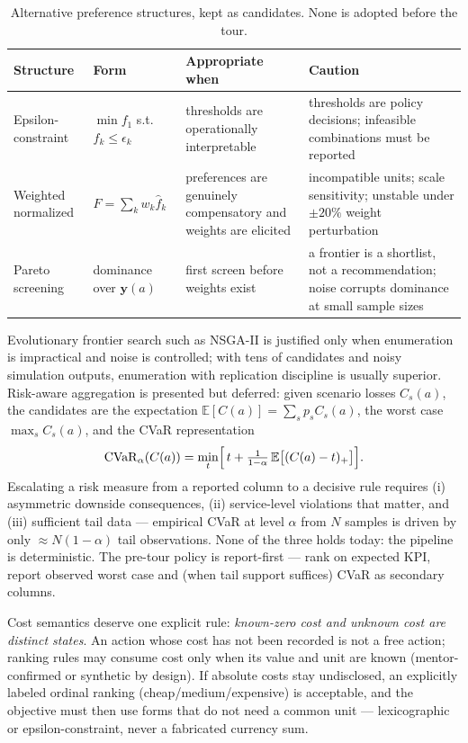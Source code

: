 \documentclass[11pt,a4paper]{article}
\newcommand{\Eop}{\mathbb{E}}
\begin{document}
\begin{table}[htbp]
\centering\small
\caption{Alternative preference structures, kept as candidates. None is
adopted before the tour.}
\label{tab:objectives}
\begin{tabular}{@{}p{2.9cm}p{4.6cm}p{3.6cm}p{3.6cm}@{}}
\toprule
Structure & Form & Appropriate when & Caution \\
\midrule
Epsilon-constraint & $\min f_1$ s.t.\ $f_k \le \epsilon_k$ & thresholds are
operationally interpretable & thresholds are policy decisions; infeasible
combinations must be reported \cite{miettinen1998nonlinear} \\
Weighted normalized & $F = \sum_k w_k \hat{f}_k$ & preferences are genuinely
compensatory and weights are elicited & incompatible units; scale sensitivity;
unstable under $\pm 20\%$ weight perturbation \\
Pareto screening & dominance over $\mathbf{y}(a)$ & first screen before
weights exist & a frontier is a shortlist, not a recommendation; noise
corrupts dominance at small sample sizes \\
\bottomrule
\end{tabular}
\end{table}

Evolutionary frontier search such as NSGA-II \cite{deb2002nsga2} is justified
only when enumeration is impractical and noise is controlled; with tens of
candidates and noisy simulation outputs, enumeration with replication
discipline is usually superior. Risk-aware aggregation is presented but
deferred: given scenario losses $C_s(a)$, the candidates are the expectation
$\Eop[C(a)] = \sum_s p_s C_s(a)$, the worst case $\max_s C_s(a)$, and the
CVaR representation \cite{rockafellar2000cvar}
\begin{equation}\label{eq:cvar}
\operatorname{CVaR}_{\alpha}(C(a)) =
\min_{t}\Bigl[\, t + \tfrac{1}{1-\alpha}\, \Eop\bigl[(C(a) - t)_+\bigr] \Bigr].
\end{equation}
Escalating a risk measure from a reported column to a decisive rule requires
(i) asymmetric downside consequences, (ii) service-level violations that
matter, and (iii) sufficient tail data --- empirical CVaR at level $\alpha$
from $N$ samples is driven by only $\approx N(1-\alpha)$ tail observations.
None of the three holds today: the pipeline is deterministic. The pre-tour
policy is report-first --- rank on expected KPI, report observed worst case
and (when tail support suffices) CVaR as secondary columns.

Cost semantics deserve one explicit rule: \emph{known-zero cost and unknown
cost are distinct states}. An action whose cost has not been recorded is not
a free action; ranking rules may consume cost only when its value and unit
are known (mentor-confirmed or synthetic by design). If absolute costs stay
undisclosed, an explicitly labeled ordinal ranking (cheap/medium/expensive)
is acceptable, and the objective must then use forms that do not need a
common unit --- lexicographic or epsilon-constraint, never a fabricated
currency sum.
\end{document}
